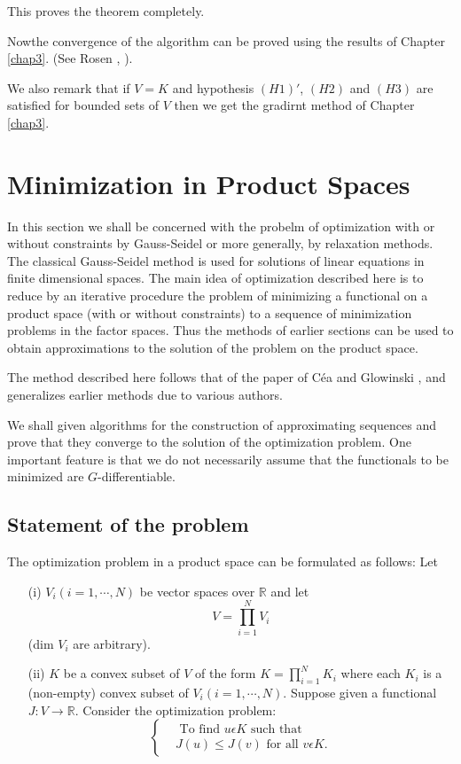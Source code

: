 This proves the theorem completely.

Now\pageoriginale the convergence of the algorithm can be proved using the results of Chapter \ref{chap3}. (See Rosen \cite{key39}, \cite{key40}).

We also remark that if $V = K$ and hypothesis $(H1)'$, $(H2)$ and $(H3)$ are satisfied for bounded sets of $V$ then we get the gradirnt method of Chapter \ref{chap3}.

\section{Minimization in Product Spaces}\label{chap4-sec4}
In this section we shall be concerned with the probelm of optimization with or without constraints by Gauss-Seidel or more generally, by relaxation methods. The classical Gauss-Seidel method is used for solutions of linear equations in finite dimensional spaces. The main idea of optimization described here is to reduce by an iterative procedure the problem of minimizing a functional on a product space (with or without constraints) to a sequence of minimization problems in the factor spaces. Thus the methods of earlier sections can be used to obtain approximations to the solution of the problem on the product space.

The method described here follows that of the paper of C\'{e}a and Glowinski \cite{key9}, and generalizes earlier methods due to various authors.

We shall given algorithms for the construction of approximating sequences and prove that they converge to the solution of the optimization problem. One important feature is that we do not necessarily assume that the functionals to be minimized are $G$-differentiable.

\subsection{Statement of the problem}\label{chap4-subsec4.1}
The optimization problem in a product space can be formulated as follows: Let
\begin{enumerate}
\item[(i)] $V_{i} (i = 1, \cdots, N)$ be vector spaces over $\mathbb{R}$ and let
$$
V = \prod_{i=1}^{N} V_{i}
$$\pageoriginale
(dim $V_{i}$ are arbitrary).

\item[(ii)] $K$ be a convex subset of $V$ of the form $K = \prod_{i=1}^{N} K_{i}$ where each $K_{i}$ is a (non-empty) convex subset of $V_{i}(i = 1, \cdots, N)$. Suppose given a functional $J : V \to \mathbb{R}$. Consider the optimization problem:
\begin{equation*}
\begin{cases}
& \text{ To find } u \epsilon K \text{ such that}\\
& J(u) \leq J(v) \text{ for all } v \epsilon K.\tag{4.1}\label{chap4-eq4.1}
\end{cases}
\end{equation*}
\end{enumerate}


